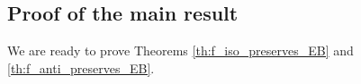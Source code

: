 \documentclass{article}[12pt]
\theoremstyle{exampstyle}
\theoremstyle{remark}
\begin{document}

        

        



\subsection{Proof of the main result}

We are ready to prove Theorems \ref{th:f_iso_preserves_EB} and \ref{th:f_anti_preserves_EB}.
\end{document}
